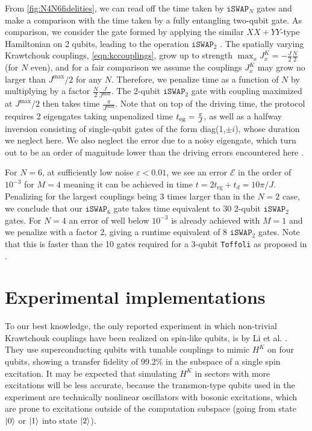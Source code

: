 From \cref{fig:N4N6fidelities}, we can read off the time taken by $\texttt{iSWAP}_N$ gates and make a comparison with the time taken by a fully entangling two-qubit gate. As comparison, we consider the gate formed by applying the similar $XX+YY$-type Hamiltonian on 2 qubits, leading to the operation $\texttt{iSWAP}_2$ \cite{Schuch2003}. The spatially varying Krawtchouk couplings, \cref{eqn:kccouplings}, grow up to strength $\max_x J^K_x = - \frac{J}{2} \frac{N}{2}$ (for $N$ even), and for a fair comparison we assume the couplings $J^K_x$ may grow no larger than $J^\text{max}/2$ for any $N$. Therefore, we penalize time as a function of $N$ by multiplying by a factor $\frac{N}{2} \frac{J}{J^\text{max}}$. The 2-qubit $\texttt{iSWAP}_2$ gate with coupling maximized at $J^\text{max}/2$ then takes time $\frac{\pi}{J^\text{max}}$. Note that on top of the driving time, the protocol requires 2 eigengates taking unpenalized time $t_\text{eg} = {\pi \over J}$, as well as a halfway inversion consisting of single-qubit gates of the form diag(1,$\pm i$), whose duration we neglect here. We also neglect the error due to a noisy eigengate, which turn out to be an order of magnitude lower than the driving errors encountered here \cite{Groenland2018}. 

For $N=6$, at sufficiently low noise $\varepsilon < 0.01$, we see an error $\mathcal{E}$ in the order of $10^{-3}$ for $M=4$ meaning it can be achieved in time $t =2 t_\text{eg} + t_d =10 \pi/J$. Penalizing for the largest couplings being 3 times larger than in the $N=2$ case, we conclude that our $\texttt{iSWAP}_6$ gate takes time equivalent to 30 2-qubit $\texttt{iSWAP}_2$ gates. For $N=4$ an error of well below $10^{-3}$ is already achieved with $M=1$ and we penalize with a factor 2, giving a runtime equivalent of 8 $\texttt{iSWAP}_2$ gates. Note that this is faster than the 10 gates required for a 3-qubit \texttt{Toffoli} as proposed in \cite{Schuch2003}. 



\section{Experimental implementations}
To our best knowledge, the only reported experiment in which non-trivial Krawtchouk couplings have been realized on spin-like qubits, is by Li et al. \cite{Li2018}. They use superconducting qubits with tunable couplings to mimic $H^K$ on four qubits, showing a transfer fidelity of 99.2\% in the subspace of a single spin excitation. It may be expected that simulating $H^K$ in sectors with more excitations will be less accurate, because the transmon-type qubits used in the experiment are technically nonlinear oscillators with bosonic excitations, which are prone to excitations outside of the computation subspace (going from state $\lvert0\rangle$ or $\lvert1\rangle$ into state  $\lvert2\rangle$).

